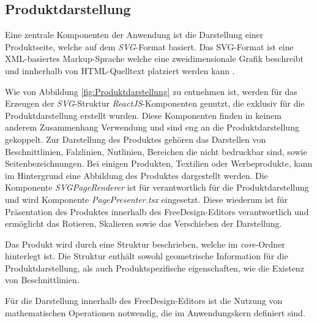 \subsection{Produktdarstellung}
Eine zentrale Komponenten der Anwendung ist die Darstellung einer Produktseite, welche auf dem \textit{SVG}-Format basiert.
Das SVG-Format ist eine XML-basiertes Markup-Sprache welche eine zweidimensionale Grafik beschreibt und innherhalb von HTML-Quelltext platziert werden kann \autocite[vgl.][]{AboutSVG}. 

Wie von Abbildung \ref{fig:Produktdarstellung} zu entnehmen ist, werden für das Erzeugen der \textit{SVG}-Struktur \textit{ReactJS}-Komponenten genutzt, die exklusiv für die Produktdarstellung erstellt wurden. Diese Komponenten finden in keinem anderem Zusammenhang Verwendung und sind eng an die Produktdarstellung gekoppelt. 
Zur Darstellung des Produktes gehören das Darstellen von Beschnittlinien, Falzlinien, Nutlinien, Bereichen die nicht bedruckbar sind, sowie Seitenbezeichnungen. Bei einigen Produkten, Textilien oder Werbeprodukte, kann im Hintergrund eine Abbildung des Produktes dargestellt werden. Die Komponente \textit{SVGPageRenderer} ist für verantwortlich für die Produktdarstellung und wird Komponente \textit{PagePresenter.tsx} eingesetzt. Diese wiederum ist für Präsentation des Produktes innerhalb des FreeDesign-Editors verantwortlich und ermöglicht das Rotieren, Skalieren sowie das Verschieben der Darstellung. 


Das Produkt wird durch eine Struktur beschrieben, welche im \textit{core}-Ordner hinterlegt ist. Die Struktur enthält sowohl geometrische Information für die Produktdarstellung, als auch Produktspezifische eigenschaften, wie die Existenz von Beschnittlinien. 

Für die Darstellung innerhalb des FreeDesign-Editors ist die Nutzung von mathematischen Operationen notwendig, die im Anwendungskern definiert sind. 

